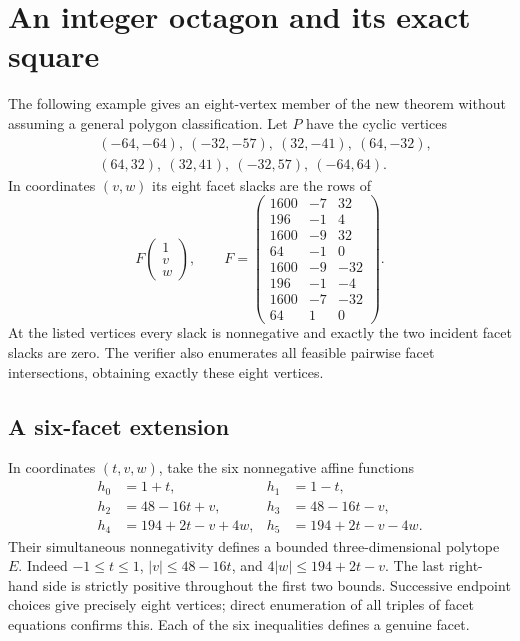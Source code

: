 \documentclass[11pt,a4paper]{article}
\theoremstyle{definition}\newtheorem{definition}[theorem]{Definition}
\theoremstyle{remark}\newtheorem{remark}[theorem]{Remark}
\begin{document}
\section{An integer octagon and its exact square}\label{sec:octagon}
The following example gives an eight-vertex member of the new theorem without
assuming a general polygon classification. Let $P$ have the cyclic vertices
\begin{equation}\label{eq:octvertices}
\begin{split}
&(-64,-64),\ (-32,-57),\ (32,-41),\ (64,-32),\\
&(64,32),\ (32,41),\ (-32,57),\ (-64,64).
\end{split}
\end{equation}
In coordinates $(v,w)$ its eight facet slacks are the rows of
\[
 F\begin{pmatrix}1\\v\\w\end{pmatrix},\qquad
 F=\begin{pmatrix}
1600&-7&32\\196&-1&4\\1600&-9&32\\64&-1&0\\
1600&-9&-32\\196&-1&-4\\1600&-7&-32\\64&1&0
\end{pmatrix}.
\]
At the listed vertices every slack is nonnegative and exactly the two incident
facet slacks are zero. The verifier also enumerates all feasible pairwise
facet intersections, obtaining exactly these eight vertices.

\subsection{A six-facet extension}
In coordinates $(t,v,w)$, take the six nonnegative affine functions
\begin{align*}
 h_0&=1+t,& h_1&=1-t,\\
 h_2&=48-16t+v,& h_3&=48-16t-v,\\
 h_4&=194+2t-v+4w,& h_5&=194+2t-v-4w.
\end{align*}
Their simultaneous nonnegativity defines a bounded three-dimensional
polytope $E$. Indeed $-1\le t\le1$, $|v|\le48-16t$, and
$4|w|\le194+2t-v$. The last right-hand side is strictly positive throughout
the first two bounds. Successive endpoint choices give precisely eight
vertices; direct enumeration of all triples of facet equations confirms this.
Each of the six inequalities defines a genuine facet.
\end{document}
